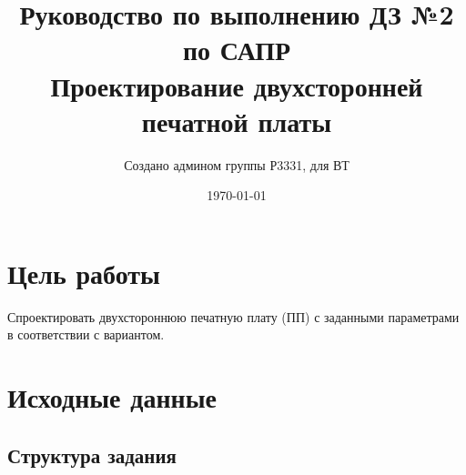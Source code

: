 \documentclass[a4paper, 12pt]{article}
\title{Руководство по выполнению ДЗ №2 по САПР \\ \large{Проектирование двухсторонней печатной платы}}
\author{Создано админом группы Р3331, для ВТ}
\date{\today}
\begin{document}
\maketitle
\tableofcontents

\newpage
\section{Цель работы}
Спроектировать двухстороннюю печатную плату (ПП) с заданными параметрами в соответствии с вариантом.

\section{Исходные данные}
\subsection{Структура задания}
\end{document}
